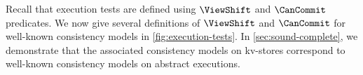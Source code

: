 Recall that execution tests are defined using  \(\ViewShift\) and \(\CanCommit\)  predicates.
We now give several definitions of \(\ViewShift\) and \(\CanCommit\) for
well-known consistency models in \cref{fig:execution-tests}. 
In \cref{sec:sound-complete}, we demonstrate that the associated consistency
models on kv-stores correspond to well-known consistency models on abstract executions. 


